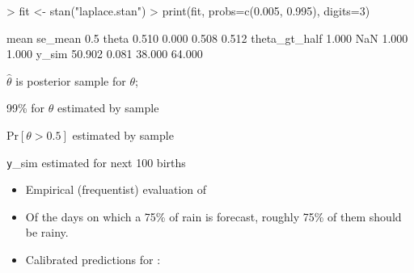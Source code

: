 \documentclass[9pt]{report}
\begin{document}
%
\begin{codein}
> fit <- stan("laplace.stan")
> print(fit, probs=c(0.005, 0.995), digits=3)
\end{codein}
\begin{codeout}
                     mean se_mean   0.5%
theta               0.510   0.000  0.508   0.512
theta_gt_half       1.000     NaN  1.000   1.000
y_sim              50.902   0.081 38.000  64.000
\end{codeout}
%
\begin{subitemize}
\item {} $\hat{\theta}$ is posterior sample  for $\theta$;
\item 99\%  for $\theta$ estimated by sample 
\item $\textrm{Pr}[\theta > 0.5]$ estimated by sample 
\item {\texttt y\_sim} estimated  for next 100 births
\end{subitemize}



\begin{itemize}
\item Empirical (frequentist) evaluation of 
\item Of the days on which a 75\% of rain is forecast, roughly 75\% of them
should be rainy. 
\item Calibrated predictions for :
\end{itemize}
\end{document}
